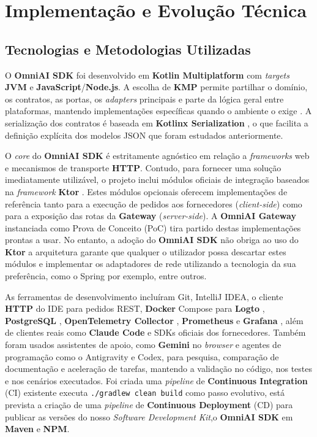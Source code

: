 
    \chapter{Implementação e Evolução Técnica}

    \section{Tecnologias e Metodologias Utilizadas}
    O \textbf{OmniAI SDK} foi desenvolvido em \textbf{Kotlin Multiplatform} \cite{kmp_ref} com \textit{targets} \textbf{JVM} e \textbf{JavaScript}/\textbf{Node.js}. A escolha de \textbf{KMP} permite partilhar o domínio, os contratos, as portas, os \textit{adapters} principais e parte da lógica geral entre plataformas, mantendo implementações específicas quando o ambiente o exige \cite{kotlin_multiplatform}. A serialização dos contratos é baseada em \textbf{Kotlinx Serialization} \cite{serialization_ref}, o que facilita a definição explícita dos modelos JSON que foram estudados anteriormente.

    O \textit{core} do \textbf{OmniAI SDK} é estritamente agnóstico em relação a \textit{frameworks} web e mecanismos de transporte \textbf{HTTP}. Contudo, para fornecer uma solução imediatamente utilizável, o projeto inclui módulos oficiais de integração baseados na \textit{framework} \textbf{Ktor} \cite{ktor_ref}. Estes módulos opcionais oferecem implementações de referência tanto para a execução de pedidos aos fornecedores (\textit{client-side}) como para a exposição das rotas da \textbf{Gateway} (\textit{server-side}). A \textbf{OmniAI Gateway} instanciada como Prova de Conceito (PoC) tira partido destas implementações prontas a usar. No entanto, a adoção do \textbf{OmniAI SDK} não obriga ao uso do \textbf{Ktor} a arquitetura garante que qualquer o utilizador possa descartar estes módulos e implementar os adaptadores de rede utilizando a tecnologia da sua preferência, como o Spring por exemplo, entre outros.

    As ferramentas de desenvolvimento incluíram Git, IntelliJ IDEA, o cliente \textbf{HTTP} do IDE para pedidos REST, \textbf{Docker} Compose para \textbf{Logto} \cite{logto_docs}, \textbf{PostgreSQL} \cite{postgresql_ref}, \textbf{OpenTelemetry Collector} \cite{opentelemetry_what_is}, \textbf{Prometheus} \cite{prometheus_ref} e \textbf{Grafana} \cite{grafana_ref}, além de clientes reais como \textbf{Claude Code} e SDKs oficiais dos fornecedores. Também foram usados assistentes de apoio, como \textbf{Gemini} no \textit{browser} e agentes de programação como o Antigravity e Codex, para pesquisa, comparação de documentação e aceleração de tarefas, mantendo a validação no código, nos testes e nos cenários executados. Foi criada uma \textit{pipeline} de \textbf{Continuous Integration} (CI) \cite{CI_ref}    existente executa \texttt{./gradlew clean build} como passo evolutivo, está prevista a criação de uma \textit{pipeline} de \textbf{Continuous Deployment} (CD) para publicar as versões do nosso \textit{Software Development Kit},o \textbf{OmniAI SDK} em \textbf{Maven} e \textbf{NPM}.

